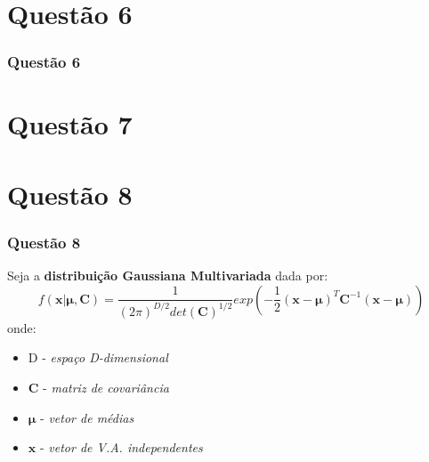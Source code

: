 \documentclass{beamer}\usepackage[]{graphicx}\usepackage[]{color}
\begin{document}
	\section{Questão 6}
		\begin{frame}
			\frametitle{Questão 6}
		\end{frame}
	\section{Questão 7}
	\section{Questão 8}
		\begin{frame}
			\frametitle{Questão 8}
			Seja a \textbf{distribuição Gaussiana Multivariada} dada por:$$f(\boldsymbol{x} \lvert \boldsymbol{\mu, C}) = \frac{1}{(2\pi)^{D/2}det(\boldsymbol{C})^{1/2}}exp(-\frac{1}{2}(\boldsymbol{x} - \boldsymbol{\mu})^{T}\boldsymbol{C}^{-1}(\boldsymbol{x} - \boldsymbol{\mu}))$$
			onde:
			\begin{itemize}
				\item D - \textit{espaço D-dimensional}
				\item \textbf{C} - \textit{matriz de covariância}
				\item $\boldsymbol{\mu}$ - \textit{vetor de médias}
				\item $\boldsymbol{x}$ - \textit{vetor de V.A. independentes}
			\end{itemize}
		\end{frame}
		
\end{document}
